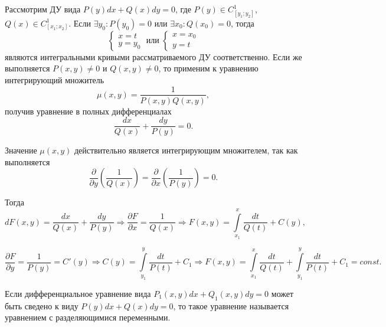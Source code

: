     Рассмотрим ДУ вида $P(y)dx + Q(x)dy = 0$, где $P(y) \in C_{[y_1; y_2]}^1$, $Q(x) \in C_{[x_1; x_2]}^1$. Если $\exists y_0: P(y_0) = 0$ или  $\exists x_0: Q(x_0) = 0$, тогда
    \begin{equation}
        \begin{cases}
            x = t \\ 
            y = y_0
        \end{cases} \;
        \text{или} \;
        \begin{cases}
            x = x_0 \\ 
            y = t
        \end{cases}
    \end{equation}
    являются интегральными кривыми рассматриваемого ДУ соответственно. Если же выполняется $P(x, y) \neq 0$ и $Q(x, y) \neq 0$, то применим к уравнению интегрирующий множитель
    \[ \mu(x, y) = \frac{1}{P(x, y)Q(x, y)}, \]
    получив уравнение в полных дифференциалах
    \begin{equation}
        \frac{dx}{Q(x)} + \frac{dy}{P(y)} = 0.
    \end{equation}

    Значение $\mu(x, y)$ действительно является интегрирующим множителем, так как выполняется
    \begin{equation}
        \frac{\partial}{\partial y} \left( \frac{1}{Q(x)} \right) =  \frac{\partial}{\partial x} \left( \frac{1}{P(y)} \right) = 0.
    \end{equation}

    Тогда
    \begin{equation}
        dF(x, y) = \frac{dx}{Q(x)} + \frac{dy}{P(y)} \Rightarrow \frac{\partial F}{\partial x} = \frac{1}{Q(x)} \Rightarrow F(x, y) = \int\limits_{x_1}^{x} \frac{dt}{Q(t)} + C(y),
    \end{equation}

    \begin{equation}
        \frac{\partial F}{\partial y} = \frac{1}{P(y)} = C'(y) \Rightarrow C(y) = \int\limits_{y_1}^{y} \frac{dt}{P(t)} + C_1 \Rightarrow F(x, y) = \int\limits_{x_1}^{x} \frac{dt}{Q(t)} + \int\limits_{y_1}^{y} \frac{dt}{P(t)} + C_1 = const.
    \end{equation}

    \begin{definition}
        Если дифференциальное уравнение вида $P_1(x, y)dx + Q_1(x, y)dy = 0$ может быть сведено к виду $P(y)dx + Q(x)dy = 0$, то такое уравнение называется уравнением с разделяющимися переменными.
    \end{definition}

